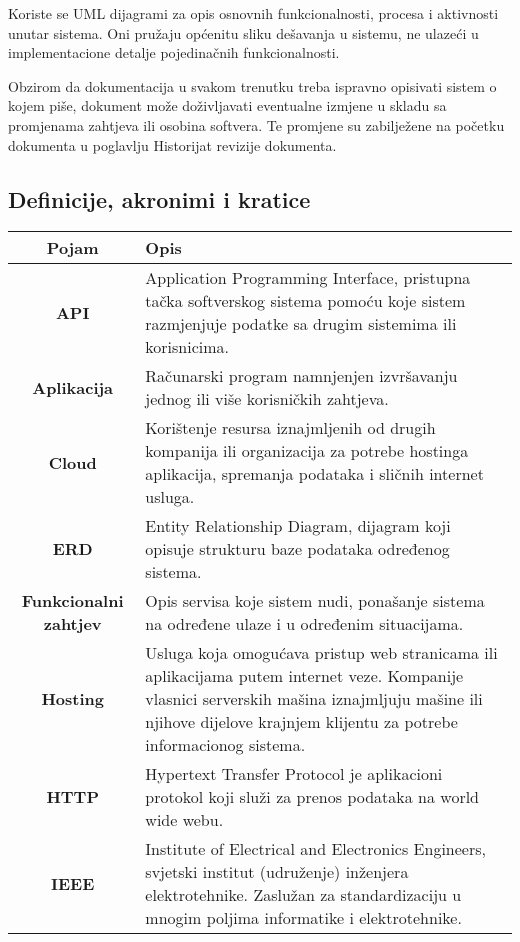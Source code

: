 Koriste se UML dijagrami za opis osnovnih funkcionalnosti, procesa i aktivnosti unutar sistema. Oni pružaju općenitu sliku dešavanja u sistemu, ne ulazeći u implementacione detalje pojedinačnih funkcionalnosti.

Obzirom da dokumentacija u svakom trenutku treba ispravno opisivati sistem o kojem piše, dokument može doživljavati eventualne izmjene u skladu sa promjenama zahtjeva ili osobina softvera. Te promjene su zabilježene na početku dokumenta u poglavlju Historijat revizije dokumenta.
\newpage
\subsection{Definicije, akronimi i kratice}

\begin{center}
    \begin{longtable}{|c |m{8cm} |} \hline
        \textbf{Pojam} & \textbf{Opis} \\ \hline
        \textbf{API} & Application Programming Interface, pristupna tačka softverskog sistema pomoću koje sistem razmjenjuje podatke sa drugim sistemima ili korisnicima. \\  \hline
        \textbf{Aplikacija} & Računarski program namnjenjen izvršavanju jednog ili više korisničkih zahtjeva. \\ \hline
        \textbf{Cloud} & Korištenje resursa iznajmljenih od drugih kompanija ili organizacija za potrebe hostinga aplikacija, spremanja podataka i sličnih internet usluga. \\ \hline
        \textbf{ERD} & Entity Relationship Diagram, dijagram koji opisuje strukturu baze podataka određenog sistema. \\  \hline
        \textbf{Funkcionalni zahtjev} & Opis servisa koje sistem nudi, ponašanje sistema na određene ulaze i u određenim situacijama.\\ \hline
        \textbf{Hosting} & Usluga koja omogućava pristup web stranicama ili aplikacijama putem internet veze. Kompanije vlasnici serverskih mašina iznajmljuju mašine ili njihove dijelove krajnjem klijentu za potrebe informacionog sistema. \\ \hline
        \textbf{HTTP} & Hypertext Transfer Protocol je aplikacioni protokol koji služi za prenos podataka na world wide webu. \\  \hline
        \textbf{IEEE} & Institute of Electrical and Electronics Engineers, svjetski institut (udruženje) inženjera elektrotehnike. Zaslužan za standardizaciju u mnogim poljima informatike i elektrotehnike. \\  \hline

\end{longtable}
\end{center}
